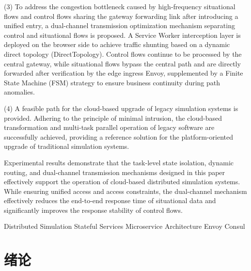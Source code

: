 \documentclass[lang=chs, degree=master, blindreview=true, winfonts=true, academic=false]{yanputhesis}
\begin{document}
\begin{engabstract}
(3) To address the congestion bottleneck caused by high-frequency situational flows and control flows sharing the gateway forwarding link after introducing a unified entry, a dual-channel transmission optimization mechanism separating control and situational flows is proposed. A Service Worker interception layer is deployed on the browser side to achieve traffic shunting based on a dynamic direct topology (DirectTopology). Control flows continue to be processed by the central gateway, while situational flows bypass the central path and are directly forwarded after verification by the edge ingress Envoy, supplemented by a Finite State Machine (FSM) strategy to ensure business continuity during path anomalies.
    
(4) A feasible path for the cloud-based upgrade of legacy simulation systems is provided. Adhering to the principle of minimal intrusion, the cloud-based transformation and multi-task parallel operation of legacy software are successfully achieved, providing a reference solution for the platform-oriented upgrade of traditional simulation systems.

Experimental results demonstrate that the task-level state isolation, dynamic routing, and dual-channel transmission mechanisms designed in this paper effectively support the operation of cloud-based distributed simulation systems. While ensuring unified access and access constraints, the dual-channel mechanism effectively reduces the end-to-end response time of situational data and significantly improves the response stability of control flows. 
    
\begin{engkeywords}                                     %
      Distributed Simulation   \ensep  Stateful Services \ensep Microservice Architecture \ensep Envoy \ensep Consul                %
    \end{engkeywords}                                       %
\end{engabstract}                                           %
\tableofcontents                                            %
\listoffigures                                              %
\listoftables                                               %
\mainmatter
\sDefault
\chapter{绪论}
\end{document}
